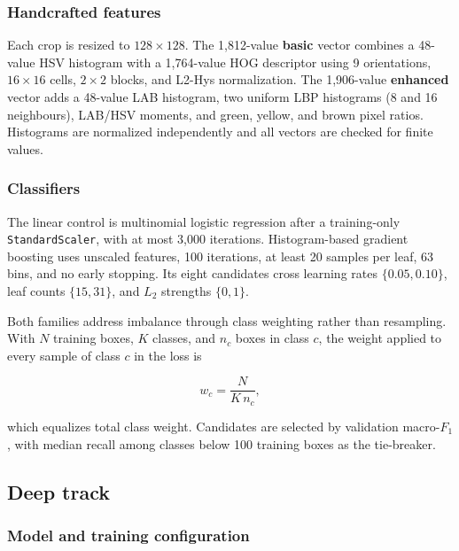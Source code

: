 \documentclass[a4paper,8pt]{article}
\begin{document}
\subsubsection{Handcrafted features}
\label{sec:features}

Each crop is resized to $128\times128$. The 1,812-value \textbf{basic} vector combines a
48-value HSV histogram with a 1,764-value HOG descriptor using 9 orientations, $16\times16$
cells, $2\times2$ blocks, and L2-Hys normalization. The 1,906-value \textbf{enhanced} vector adds
a 48-value LAB histogram, two uniform LBP histograms (8 and 16 neighbours), LAB/HSV moments, and
green, yellow, and brown pixel ratios. Histograms are normalized independently and all vectors
are checked for finite values.

\subsubsection{Classifiers}

The linear control is multinomial logistic regression after a training-only
\texttt{StandardScaler}, with at most 3,000 iterations. Histogram-based gradient boosting uses
unscaled features, 100 iterations, at least 20 samples per leaf, 63 bins, and no early stopping.
Its eight candidates cross learning rates $\{0.05,0.10\}$, leaf counts $\{15,31\}$, and
$L_2$ strengths $\{0,1\}$.

Both families address imbalance through class weighting rather than resampling. With $N$ training
boxes, $K$ classes, and $n_c$ boxes in class $c$, the weight applied to every sample of class $c$
in the loss is

\begin{equation}
w_c = \frac{N}{K \, n_c},
\label{eq:balanced}
\end{equation}

which equalizes total class weight. Candidates are
selected by validation macro-$F_1$, with median recall among classes below 100 training boxes as
the tie-breaker.

\subsection{Deep track}
\label{sec:yolo-method}

\subsubsection{Model and training configuration}
\end{document}
